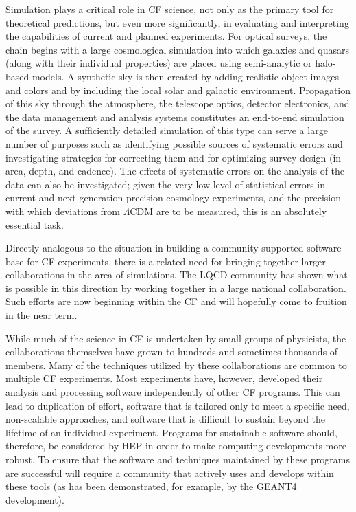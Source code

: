 Simulation plays a critical role in
CF science, not only as the primary tool for theoretical
predictions, but even more significantly, in evaluating and
interpreting the capabilities of current and planned experiments. For
optical surveys, the chain begins with a large cosmological simulation
into which galaxies and quasars (along with their individual
properties) are placed using semi-analytic or halo-based models. A
synthetic sky is then created by adding realistic object images and
colors and by including the local solar and galactic
environment. Propagation of this sky through the atmosphere, the
telescope optics, detector electronics, and the data management and
analysis systems constitutes an end-to-end simulation of the survey. A
sufficiently detailed simulation of this type can serve a large number
of purposes such as identifying possible sources of systematic errors
and investigating strategies for correcting them and for optimizing
survey design (in area, depth, and cadence). The effects of systematic
errors on the analysis of the data can also be investigated; given the
very low level of statistical errors in current and next-generation
precision cosmology experiments, and the precision with which
deviations from $\Lambda$CDM are to be measured, this is an absolutely
essential task.

Directly analogous to the situation in building a community-supported
software base for CF experiments, there is a related need
for bringing together larger collaborations in the area of
simulations. The LQCD community has shown what is possible in this
direction by working together in a large national collaboration. Such
efforts are now beginning within the CF and will
hopefully come to fruition in the near term.


While much of the science in CF is undertaken by small
groups of physicists, the collaborations themselves have grown to
hundreds and sometimes thousands of members. Many of the techniques
utilized by these collaborations are common to multiple CF 
experiments. Most experiments have, however, developed their
analysis and processing software independently of other CF 
programs. This can lead to duplication of effort, software
that is tailored only to meet a specific need, non-scalable
approaches, and software that is difficult to sustain beyond the
lifetime of an individual experiment. Programs for sustainable
software should, therefore, be considered by HEP in order to make
computing developments more robust. To ensure that the software and
techniques maintained by these programs are successful will require a
community that actively uses and develops within these tools (as has
been demonstrated, for example, by the GEANT4 development). 



